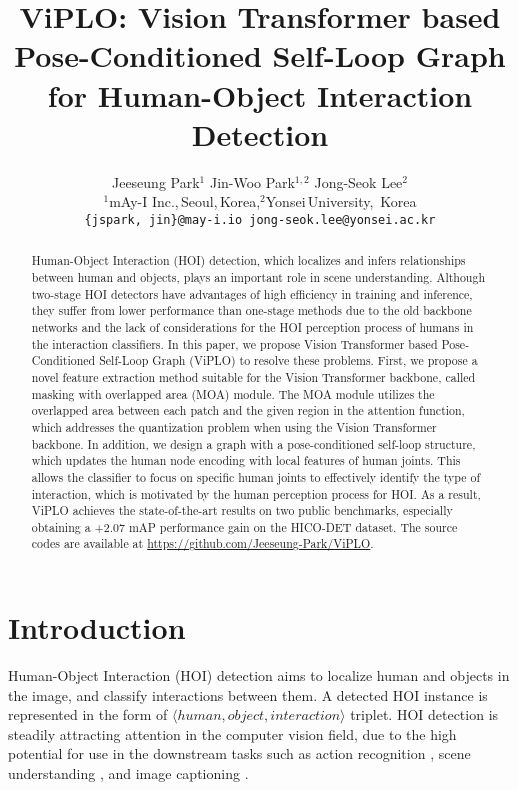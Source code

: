 \documentclass[10pt,twocolumn,letterpaper]{article}
\begin{document}
\title{ViPLO: Vision Transformer based Pose-Conditioned Self-Loop Graph for Human-Object Interaction Detection}

\author{
Jeeseung Park$^1$ \qquad Jin-Woo Park$^{1,2}$ \qquad Jong-Seok Lee$^2$ \smallskip\\
{$^{1}$mAy-I Inc.,\,Seoul,\,Korea,\qquad $^{2}$Yonsei\,University, \,Korea} \\
{\tt\small \{jspark,\,jin\}@may-i.io \qquad jong-seok.lee@yonsei.ac.kr}
}



\maketitle

\begin{abstract}
   Human-Object Interaction (HOI) detection, which localizes and infers relationships between human and objects, plays an important role in scene understanding. Although two-stage HOI detectors have advantages of high efficiency in training and inference, they suffer from lower performance than one-stage methods due to the old backbone networks and the lack of considerations for the HOI perception process of humans in the interaction classifiers. In this paper, we propose Vision Transformer based Pose-Conditioned Self-Loop Graph (ViPLO) to resolve these problems. First, we propose a novel feature extraction method suitable for the Vision Transformer backbone, called masking with overlapped area (MOA) module. The MOA module utilizes the overlapped area between each patch and the given region in the attention function, which addresses the quantization problem when using the Vision Transformer backbone. In addition, we design a graph with a pose-conditioned self-loop structure, which updates the human node encoding with local features of human joints. This allows the classifier to focus on specific human joints to effectively identify the type of interaction, which is motivated by the human perception process for HOI. As a result, ViPLO achieves the state-of-the-art results on two public benchmarks, especially obtaining a +2.07 mAP performance gain on the HICO-DET dataset. The source codes are available at \url{https://github.com/Jeeseung-Park/ViPLO}.

\end{abstract}

\section{Introduction}
\label{sec:1}
Human-Object Interaction (HOI) detection aims to localize human and objects in the image, and classify interactions between them. A detected HOI instance is represented in the form of {\emph{$\langle human, object, interaction\rangle$}} triplet. HOI detection is steadily attracting attention in the computer vision field, due to the high potential for use in the downstream tasks such as action recognition \cite{yan2018spatial}, scene understanding \cite{xiao2018unified}, and image captioning \cite{you2016image}.
\end{document}
